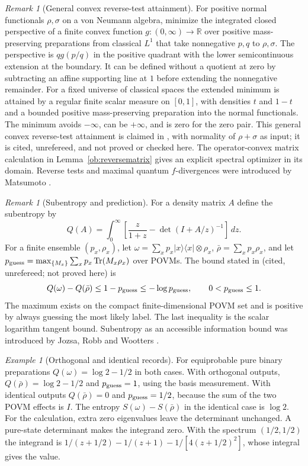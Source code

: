\documentclass[aps,pra,onecolumn,superscriptaddress,nofootinbib,10pt]{revtex4-2}
\theoremstyle{definition}
\theoremstyle{remark}
\newtheorem{remark}[theorem]{Remark}
\newtheorem{example}[theorem]{Example}
\newcommand{\tr}{\operatorname{Tr}}
\begin{document}
\begin{remark}[General convex reverse-test attainment]\label{ob:reversegeneral}
For positive normal functionals \(\rho,\sigma\) on a von Neumann algebra,
minimize the integrated closed perspective of a finite convex function
\(g:(0,\infty)\to\mathbb R\) over positive mass-preserving preparations
from classical \(L^1\) that take nonnegative \(p,q\) to \(\rho,\sigma\).
The perspective is \(qg(p/q)\) in the positive quadrant with the
lower semicontinuous extension at the boundary. It can be defined
without a quotient at zero by subtracting an affine supporting line at
\(1\) before extending the nonnegative remainder. For a fixed universe
of classical spaces the extended minimum is attained by a regular
finite scalar measure on \([0,1]\), with densities \(t\) and \(1-t\) and
a bounded positive mass-preserving preparation into the normal
functionals. The minimum avoids \(-\infty\), can be \(+\infty\), and is
zero for the zero pair. This general convex reverse-test
attainment is claimed in \cite{obr:leanreverse}, with normality
of \(\rho+\sigma\) as input; it is cited, unrefereed, and not proved or checked here. The operator-convex matrix calculation in
Lemma~\ref{ob:reversematrix} gives an explicit spectral optimizer
in its domain. Reverse tests and maximal quantum \(f\)-divergences
were introduced by Matsumoto \cite{obr:matsumoto}.
\end{remark}

\begin{remark}[Subentropy and prediction]\label{ob:subentropy}
For a density matrix \(A\) define the subentropy by
\[
 Q(A)=\int_0^\infty
 \left[\frac{z}{1+z}-\det(I+A/z)^{-1}\right]\,dz .
\]
For a finite ensemble \((p_x,\rho_x)\), let
\(\omega=\sum_x p_x |x\rangle\langle x|\otimes\rho_x\),
\(\bar\rho=\sum_xp_x\rho_x\), and let
\(p_{\rm guess}=\max_{\{M_x\}}\sum_xp_x\tr(M_x\rho_x)\) over POVMs.
The bound stated in \cite{obr:leansubentropy} (cited, unrefereed; not proved here) is
\[
 Q(\omega)-Q(\bar\rho)\le1-p_{\rm guess}\le-\log p_{\rm guess},
 \qquad 0<p_{\rm guess}\le1 .
\]
The maximum exists on the compact finite-dimensional POVM set and is
positive by always guessing the most likely label. The last inequality
is the scalar logarithm tangent bound. Subentropy as an accessible
information bound was introduced by Jozsa, Robb and Wootters
\cite{obr:jrw}.
\end{remark}

\begin{example}[Orthogonal and identical records]\label{ob:subentropyexample}
For equiprobable pure binary preparations \(Q(\omega)=\log2-1/2\)
in both cases. With orthogonal outputs,
\(Q(\bar\rho)=\log2-1/2\) and \(p_{\rm guess}=1\), using the basis
measurement. With identical outputs \(Q(\bar\rho)=0\) and
\(p_{\rm guess}=1/2\), because the sum of the two POVM effects is
\(I\). The entropy \(S(\omega)-S(\bar\rho)\) in the identical case is
\(\log2\). For the calculation, extra zero eigenvalues leave the
determinant unchanged. A pure-state determinant makes the integrand
zero. With the spectrum \((1/2,1/2)\) the integrand is
\(1/(z+1/2)-1/(z+1)-1/[4(z+1/2)^2]\), whose integral gives the value.
\end{example}
\end{document}
